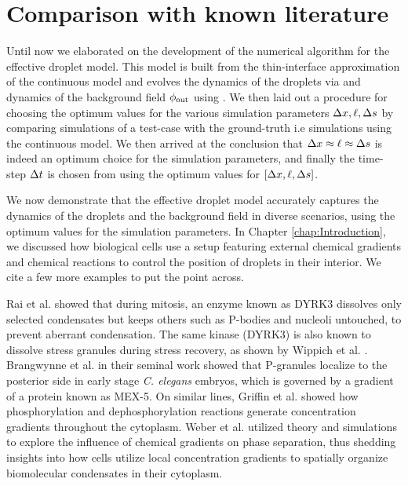 \onehalfspacing

\chapter{Comparison with known literature}

\label{chap:Chapter_5}

Until now we elaborated on the development of the numerical algorithm for the effective droplet model.
This model is built from the thin-interface approximation of the continuous model  and evolves the dynamics of the droplets via  and dynamics of the background field $\phi_\mathrm{out}$ using .
We then laid out a procedure for choosing the optimum values for the various simulation parameters $\Delta x, \ell, \Delta s$ by comparing simulations of a test-case with the ground-truth i.e simulations using the continuous model.
We then arrived at the conclusion that $\Delta x \approx \ell \approx \Delta s$ is indeed an optimum choice for the simulation parameters, and finally the time-step $\Delta t$ is chosen from  using the optimum values for $[\Delta x, \ell, \Delta s]$. 

We now demonstrate that the effective droplet model accurately captures the dynamics of the droplets and the background field in diverse scenarios, using the optimum values for the simulation parameters.
In Chapter \ref{chap:Introduction}, we discussed how biological cells use a setup featuring external chemical gradients and chemical reactions to control the position of droplets in their interior.
We cite a few more examples to put the point across. 

Rai et al. \cite{Rai2018} showed that during mitosis, an enzyme known as DYRK3 dissolves only selected condensates but keeps others such as P-bodies and nucleoli untouched, to prevent aberrant condensation.
The same kinase (DYRK3) is also known to dissolve stress granules during stress recovery, as shown by Wippich et al. \cite{Wippich2013}.
Brangwynne et al. \cite{Brangwynne2009} in their seminal work showed that P-granules localize to the posterior side in early stage \textit{C. elegans} embryos, which is governed by a gradient of a protein known as MEX-5.
On similar lines, Griffin et al. \cite{Griffin2011} showed how phosphorylation and dephosphorylation reactions generate concentration gradients throughout the cytoplasm.
Weber et al. \cite{Weber2017} utilized theory and simulations to explore the influence of chemical gradients on phase separation, thus shedding insights into how cells utilize local concentration gradients to spatially organize biomolecular condensates in their cytoplasm.

